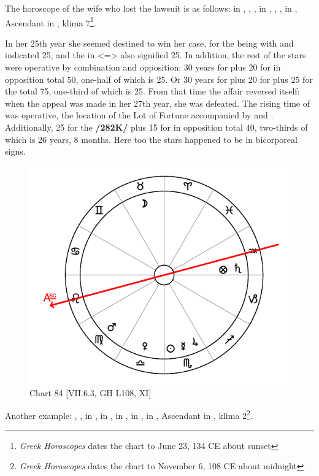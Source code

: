 The horoscope of the wife who lost the lawsuit is as follows: \Sun\xspace in \Cancer, \Moon, \Saturn, \Jupiter\xspace in
\Sagittarius, \Mars, \Venus, \Mercury\xspace in \Gemini, Ascendant in \Capricorn, klima 7\footnote{\textit{Greek Horoscopes} dates the chart to June 23, 134 CE about sunset}.

In her 25th year she seemed destined to win her case, for the \Moon\xspace being with \Jupiter\xspace and \Saturn\xspace indicated 25, and the \Sun\xspace in \Cancer <=\Moon> also signified 25. In addition, the rest of the stars were operative by combination and opposition: 30 years for \Saturn\xspace plus 20 for \Mercury\xspace in opposition total 50, one-half of which is 25. Or 30
years for \Saturn\xspace plus 20 for \Mercury\xspace plus 25 for the \Moon\xspace total 75, one-third of which is 25. From that time the affair reversed itself: when the appeal was made in her 27th year, she was defeated. The rising time of \Gemini\xspace <27> was operative, the location of the Lot of Fortune accompanied by \Mars\xspace and \Mercury. Additionally, 25 for the \Moon\xspace \textbf{/282K/} plus 15 for \Mars\xspace in opposition total 40, two-thirds of which is 26 years, 8 months. Here too the stars happened to be in bicorporeal signs.

\newpage
\begin{figure}
\centering
\vspace{0pt}
\includegraphics[width=.68\textwidth]{charts/7_6_03}
\caption{Chart 84 [VII.6.3, GH L108, XI]}
\label{fig:chart84}
\end{figure} 

Another example: \Sun, \Mercury, \Jupiter\xspace in \Scorpio, \Moon\xspace in \Taurus, \Saturn\xspace in \Aquarius, \Mars\xspace in \Virgo, \Venus\xspace in \Libra, Ascendant in \Leo, klima 2\footnote{\textit{Greek Horoscopes} dates the chart to November 6, 108 CE about midnight}.

